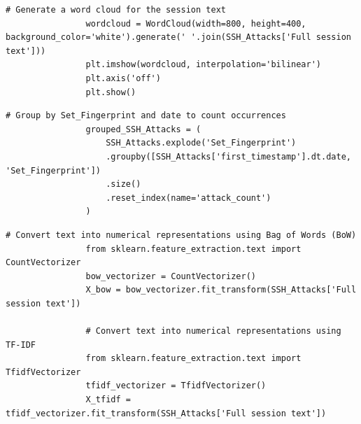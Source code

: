             \vspace{0.5em}

            \begin{lstlisting}[caption={Generate a word cloud from session text}, label={lst:generate-wordcloud}]
                # Generate a word cloud for the session text
                wordcloud = WordCloud(width=800, height=400, background_color='white').generate(' '.join(SSH_Attacks['Full session text']))
                plt.imshow(wordcloud, interpolation='bilinear')
                plt.axis('off')
                plt.show()
            \end{lstlisting}
            
            \vspace{0.5em}

            \begin{lstlisting}[caption={Group attacks by fingerprint and date}, label={lst:group-attacks}]
                # Group by Set_Fingerprint and date to count occurrences
                grouped_SSH_Attacks = (
                    SSH_Attacks.explode('Set_Fingerprint')
                    .groupby([SSH_Attacks['first_timestamp'].dt.date, 'Set_Fingerprint'])
                    .size()
                    .reset_index(name='attack_count')
                )
            \end{lstlisting}
            
            \vspace{0.5em}

            \begin{lstlisting}[caption={Convert text into numerical representations}, label={lst:convert-text-numerical}]
                # Convert text into numerical representations using Bag of Words (BoW)
                from sklearn.feature_extraction.text import CountVectorizer
                bow_vectorizer = CountVectorizer()
                X_bow = bow_vectorizer.fit_transform(SSH_Attacks['Full session text'])

                # Convert text into numerical representations using TF-IDF
                from sklearn.feature_extraction.text import TfidfVectorizer
                tfidf_vectorizer = TfidfVectorizer()
                X_tfidf = tfidf_vectorizer.fit_transform(SSH_Attacks['Full session text'])
            \end{lstlisting}
            
